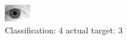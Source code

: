 \begin{figure}[h!]
\begin{center}
\includegraphics[width=0.60\columnwidth]{figures/ID2175_class_4_target_3.png}
\end{center}
\caption{ Classification: 4 actual target: 3}
\label{fig:ID2175_class_4_target_3}
\end{figure}
